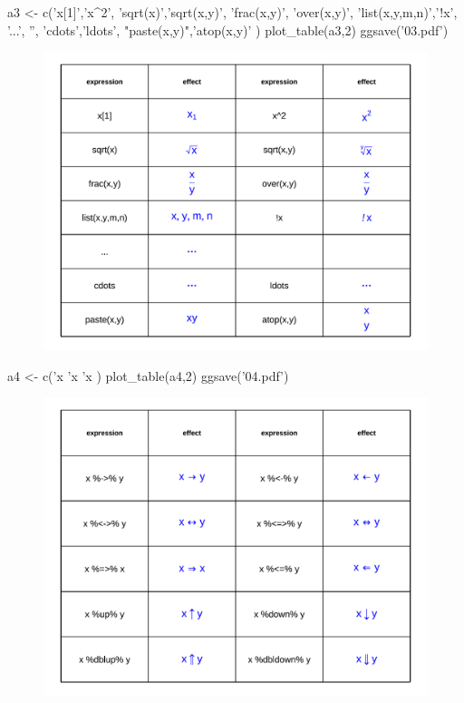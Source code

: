 \documentclass[10 pt,landscape]{article}
\begin{document}
\begin{multicols*}{3}
     \begin{R}
a3 <- c('x[1]','x^2', 'sqrt(x)','sqrt(x,y)',
        'frac(x,y)', 'over(x,y)',
        'list(x,y,m,n)','!x',
        '...', '',
        'cdots','ldots', "paste(x,y)",'atop(x,y)'
        )
plot_table(a3,2)
ggsave('03.pdf')
     \end{R}
     \begin{figure}[H]
      \centering
        \includegraphics[width = 1\linewidth]{03.pdf}
      \end{figure}
     
     \begin{R}
a4 <- c('x %
        'x %
        'x %
)
plot_table(a4,2)
ggsave('04.pdf')
     \end{R}
     
     \begin{figure}[H]
      \centering
        \includegraphics[width = 1\linewidth]{04.pdf}
      \end{figure}
      

\end{multicols*}
\end{document}
